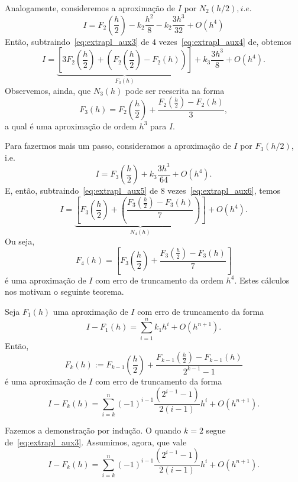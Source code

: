 Analogamente, consideremos a aproximação de $I$ por $N_2(h/2), i.e.$
\begin{equation}\label{eq:extrapl_aux4}
  I = F_2\left(\frac{h}{2}\right) - k_2\frac{h^2}{8} - k_2\frac{3h^3}{32} + O(h^4)
\end{equation}
Então, subtraindo~\eqref{eq:extrapl_aux3} de $4$ vezes~\eqref{eq:extrapl_aux4} de, obtemos
\begin{equation}\label{eq:extrapl_aux5}
  I = \underbrace{\left[3F_2\left(\frac{h}{2}\right) + \left(F_2\left(\frac{h}{2}\right) - F_2(h)\right)\right]}_{F_3(h)} + k_3\frac{3h^3}{8} + O(h^4).
\end{equation}
Observemos, ainda, que $N_3(h)$ pode ser reescrita na forma
\begin{equation}
  F_3(h) = F_2\left(\frac{h}{2}\right) + \frac{F_2\left(\frac{h}{2}\right) - F_2(h)}{3},
\end{equation}
a qual é uma aproximação de ordem $h^3$ para $I$.

Para fazermos mais um passo, consideramos a aproximação de $I$ por $F_3(h/2)$, i.e.
\begin{equation}\label{eq:extrapl_aux6}
  I = F_3\left(\frac{h}{2}\right) + k_3\frac{3h^3}{64} + O(h^4).
\end{equation}
E, então, subtraindo~\eqref{eq:extrapl_aux5} de $8$ vezes~\eqref{eq:extrapl_aux6}, temos
\begin{equation}
  I = \underbrace{\left[F_3\left(\frac{h}{2} \right)+ \left(\frac{F_3\left(\frac{h}{2}\right)-F_3(h)}{7}\right)\right]}_{N_4(h)} + O(h^4).
\end{equation}
Ou seja,
\begin{equation}
  F_4(h) = \left[F_3\left(\frac{h}{2}\right) + \frac{F_3\left(\frac{h}{2}\right)-F_3(h)}{7}\right]
\end{equation}
é uma aproximação de $I$ com erro de truncamento da ordem $h^4$. Estes cálculos nos motivam o seguinte teorema.

\begin{teo}
  Seja $F_1(h)$ uma aproximação de $I$ com erro de truncamento da forma
  \begin{equation}
    I-F_1(h) = \sum_{i=1}^n k_1h^i + O(h^{n+1}).
  \end{equation}
Então,
\begin{equation}
  F_k(h) := F_{k-1}\left(\frac{h}{2}\right) + \frac{F_{k-1}\left(\frac{h}{2}\right) - F_{k-1}(h)}{2^{k-1}-1}
\end{equation}
é uma aproximação de $I$ com erro de truncamento da forma
\begin{equation}
  I-F_{k}(h) = \sum_{i=k}^n (-1)^{i-1}\frac{\left(2^{i-1}-1\right)}{2(i-1)}h^i + O(h^{n+1}).
\end{equation}
\end{teo}
\begin{dem}
  Fazemos a demonstração por indução. O quando $k=2$ segue de~\eqref{eq:extrapl_aux3}. Assumimos, agora, que vale
  \begin{equation}
    I-F_{k}(h) = \sum_{i=k}^n (-1)^{i-1}\frac{\left(2^{i-1}-1\right)}{2(i-1)}h^i + O(h^{n+1}).
  \end{equation}

\emconstrucao
\end{dem}


\emconstrucao